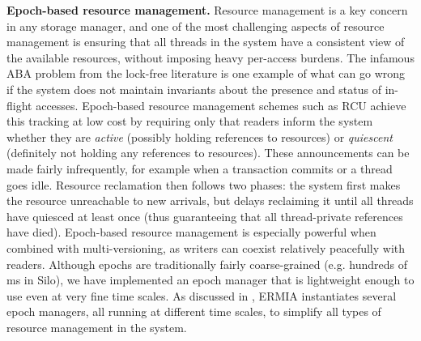 \vspace{2mm}
{\bf Epoch-based resource management.}
Resource management is a key concern in any storage manager, and one of the most challenging aspects of resource management is ensuring that all threads in the system have a consistent view of the available resources, without imposing heavy per-access burdens. The infamous ABA problem from the lock-free literature is one example of what can go wrong if the system does not maintain invariants about the presence and status of in-flight accesses. Epoch-based resource management schemes such as RCU \cite{McKenneyS98} achieve this tracking at low cost by requiring only that readers inform the system whether they are {\em active} (possibly holding references to resources) or {\em quiescent} (definitely not holding any references to resources). These announcements can be made fairly infrequently, for example when a transaction commits or a thread goes idle. Resource reclamation then follows two phases: the system first makes the resource unreachable to new arrivals, but delays reclaiming it until all threads have quiesced at least once (thus guaranteeing that all thread-private references have died). Epoch-based resource management is especially powerful when combined with multi-versioning, as writers can coexist relatively peacefully with readers. Although epochs are traditionally fairly coarse-grained (e.g. hundreds of ms in Silo), we have implemented an epoch manager that is lightweight enough to use even at very fine time scales. As discussed in , ERMIA instantiates several epoch managers, all running at different time scales, to simplify all types of resource management in the system. 

